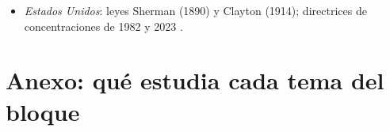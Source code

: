 \documentclass[11pt]{article}
\begin{document}
\begin{itemize}
\begin{itemize}
\begin{itemize}
    \item Ley 34/1998, del sector de hidrocarburos (acceso de terceros a oleoductos y almacenamientos, art.~41)\nocite{BOE1998LH}, y Real Decreto-ley 6/2000 (límites al accionariado de CLH, hoy Exolum)\nocite{BOE2000RDL6};
    \item circulares de la CNMC: 2/2019 (tasa de retribución financiera)\nocite{CNMC2019Circular2} y su reforma, la 9/2025\nocite{CNMC2025Circular9}; 8/2025, de la retribución de la distribución eléctrica\nocite{CNMC2025Circular8}; 3/2020, de los peajes eléctricos\nocite{CNMC2020Circular3}; 5/2026, de la tasa de retribución del gas\nocite{CNMC2026Circular5};
    \end{itemize}
  \item \emph{Transporte y telecomunicaciones}:
    \begin{itemize}
    \item Ley 39/2003, del Sector Ferroviario (separación de ADIF y Renfe Operadora)\nocite{BOE2003LSF}, sustituida por la Ley 38/2015, del Sector Ferroviario\nocite{BOE2015LSF}, y Ley 11/2022, General de Telecomunicaciones\nocite{Ley11_2022Telecomunicaciones};
    \item DORA 2027-2031 de Aena\nocite{BOE2026DORA};
    \end{itemize}
  \item \emph{Precios públicos}: Ley 2/2015, de desindexación de la economía española\nocite{BOE2015Desindexacion}, y Real Decreto 55/2017\nocite{BOE2017RD55}.
  \end{itemize}
\item \emph{Estados Unidos}: leyes Sherman (1890) y Clayton (1914); directrices de concentraciones de 1982 y 2023\nocite{DOJ1982Merger,DOJFTC2023Merger} .
\end{itemize}

\section{Anexo: qué estudia cada tema del bloque}\label{anexo:bloque}
\end{document}
